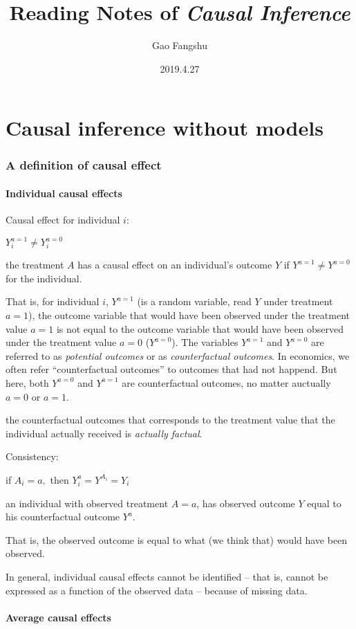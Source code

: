 \documentclass{article}
\title{Reading Notes of \textit{Causal Inference}}
\author{Gao Fangshu}
\date{2019.4.27}
\begin{document}
\maketitle
\part*{Causal inference without models}
\section{A definition of causal effect}
\subsection{Individual causal effects}
\begin{mdframed}
Causal effect for individual $i$: 
\begin{center}
	$Y_{i}^{a=1} \neq Y_{i}^{a=0}$
\end{center}
the treatment $A$ has a causal effect on an individual’s outcome $Y$ if $Y^{a=1} \neq Y^{a=0}$ for the individual.
\end{mdframed}
That is, for individual $i$,  $Y^{a=1}$ (is a random variable, read $Y$ under treatment $a=1$), the outcome variable that would have been observed under the treatment value $a=1$ is not equal to the outcome variable that would have been observed under the treatment value $a=0$ ($Y^{a=0}$). The variables  $Y^{a=1}$ and $Y^{a=0}$ are referred to as \textit{potential outcomes} or as \textit{counterfactual outcomes}. In economics, we often refer ``counterfactual outcomes'' to outcomes that had not happend. But here, both $Y^{a=0}$ and $Y^{a=1}$ are counterfactual outcomes, no matter auctually $a=0$ or $a=1$. 

the counterfactual outcomes that corresponds to the treatment value that the individual actually received is \textit{actually factual}.
\begin{mdframed}
Consistency:
\begin{center}
if $A_{i}=a,$ then $Y_{i}^{a}=Y^{A_{i}}=Y_{i}$
\end{center}
an individual with observed treatment $A=a$, has observed outcome $Y$ equal to his counterfactual outcome $Y^{a}$.
\end{mdframed}
That is, the observed outcome is equal to what (we think that) would have been observed.

In general, individual causal effects cannot be identified -- that is, cannot be expressed as a function of the observed data -- because of missing data. 

\subsection{Average causal effects}
\end{document}
